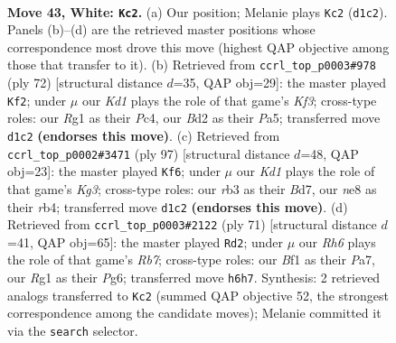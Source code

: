 \documentclass[11pt]{article}
\begin{document}
\clearpage

\begin{figure}[p]\centering
\begin{subfigure}{0.46\textwidth}\centering
\resizebox{\linewidth}{!}{%
\newchessgame
\chessboard[
  setfen={4n3/p1p5/2k2p1R/8/4rP1p/1r6/3B3P/3K1BR1 w - - 0 43},
  showmover=false,
  pgfstyle=straightmove, color=movearrow, markmove={d1-c2}
]}
\caption{}
\end{subfigure}\hfill
\begin{subfigure}{0.46\textwidth}\centering
\resizebox{\linewidth}{!}{%
\newchessgame
\chessboard[
  setfen={3r4/4r3/pRBp4/P1n2pk1/2P5/5KP1/8/3R4 w - - 0 37},
  showmover=false,
  pgfstyle=straightmove, color=movearrow, markmove={f3-f2}
]}
\caption{}
\end{subfigure}
\\[4pt]
\begin{subfigure}{0.46\textwidth}\centering
\resizebox{\linewidth}{!}{%
\newchessgame
\chessboard[
  setfen={1r6/1P1b4/6k1/3Pp3/1R5p/p1N5/5KP1/8 b - - 1 49},
  showmover=false,
  pgfstyle=straightmove, color=movearrow, markmove={g6-f6}
]}
\caption{}
\end{subfigure}\hfill
\begin{subfigure}{0.46\textwidth}\centering
\resizebox{\linewidth}{!}{%
\newchessgame
\chessboard[
  setfen={3r4/p4k2/3P2pp/1p4b1/6N1/PP1R4/1r3PK1/4R3 b - - 0 36},
  showmover=false,
  pgfstyle=straightmove, color=movearrow, markmove={b2-d2}
]}
\caption{}
\end{subfigure}
\caption{\textbf{Move 43, White: \texttt{Kc2}.} (a) Our position; Melanie plays \texttt{Kc2} (\texttt{d1c2}). Panels (b)--(d) are the retrieved master positions whose correspondence most drove this move (highest QAP objective among those that transfer to it). (b) Retrieved from \texttt{ccrl\_top\_p0003\#978} (ply 72) [structural distance $d$=35, QAP obj=29]: the master played \texttt{Kf2}; under $\mu$ our \emph{Kd1} plays the role of that game's \emph{Kf3}; cross-type roles: our \emph{R}g1 as their \emph{P}c4, our \emph{B}d2 as their \emph{P}a5; transferred move \texttt{d1c2} \textbf{(endorses this move)}. (c) Retrieved from \texttt{ccrl\_top\_p0002\#3471} (ply 97) [structural distance $d$=48, QAP obj=23]: the master played \texttt{Kf6}; under $\mu$ our \emph{Kd1} plays the role of that game's \emph{Kg3}; cross-type roles: our \emph{r}b3 as their \emph{B}d7, our \emph{n}e8 as their \emph{r}b4; transferred move \texttt{d1c2} \textbf{(endorses this move)}. (d) Retrieved from \texttt{ccrl\_top\_p0003\#2122} (ply 71) [structural distance $d$=41, QAP obj=65]: the master played \texttt{Rd2}; under $\mu$ our \emph{Rh6} plays the role of that game's \emph{Rb7}; cross-type roles: our \emph{B}f1 as their \emph{P}a7, our \emph{R}g1 as their \emph{P}g6; transferred move \texttt{h6h7}. Synthesis: 2 retrieved analogs transferred to \texttt{Kc2} (summed QAP objective 52, the strongest correspondence among the candidate moves); Melanie committed it via the \texttt{search} selector.}
\label{fig:thought-m84}
\end{figure}
\end{document}
